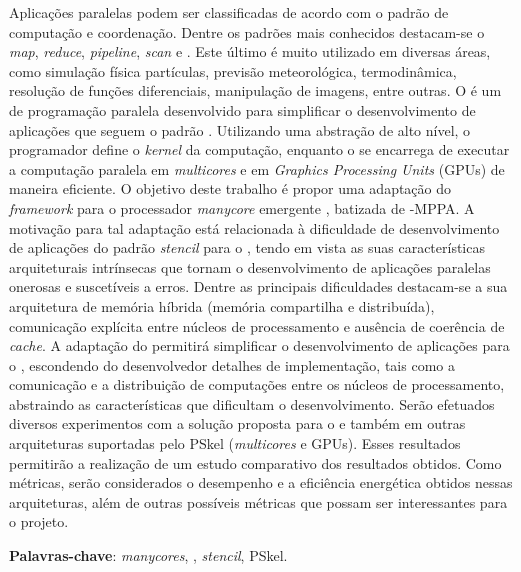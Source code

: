 
\setlength{\absparsep}{18pt} %
\begin{resumo}
Aplicações paralelas podem ser classificadas de acordo com o padrão de
computação e coordenação. Dentre os padrões mais conhecidos destacam-se o
\textit{map}, \textit{reduce}, \textit{pipeline}, \textit{scan} e \stencil.
Este último é muito utilizado em diversas áreas, como
simulação física partículas, previsão meteorológica, termodinâmica, resolução de
funções diferenciais, manipulação de imagens, entre outras. O \pskel é um \fw de
programação paralela desenvolvido para simplificar o desenvolvimento de
aplicações que seguem o padrão \stencil. Utilizando uma abstração de alto nível, o
programador define o \emph{kernel} da computação, enquanto o \fw se encarrega de
executar a computação paralela em \textit{multicores} e em \textit{Graphics Processing Units}
(GPUs) de maneira eficiente.
%
O objetivo deste trabalho é propor uma adaptação do \textit{framework} \pskel
para o processador \textit{manycore} emergente \mppa, batizada de \pskel-MPPA. A
motivação para tal adaptação está relacionada à dificuldade de desenvolvimento
de aplicações do padrão \textit{stencil} para o \mppa, tendo em vista as suas
características arquiteturais intrínsecas que tornam o desenvolvimento de
aplicações paralelas onerosas e suscetíveis a erros. Dentre as principais dificuldades
destacam-se a sua arquitetura de memória híbrida (memória compartilha e
distribuída), comunicação explícita entre núcleos de processamento e ausência de coerência de
\textit{cache}. A adaptação do \fw permitirá simplificar o desenvolvimento de
aplicações \stencil para o \mppa, escondendo do desenvolvedor detalhes de
implementação, tais como a comunicação e a distribuição de computações entre os
núcleos de processamento, abstraindo as características que dificultam o
desenvolvimento.
%
Serão efetuados diversos experimentos com a solução proposta para o \mppa
e também em outras arquiteturas suportadas pelo PSkel
(\textit{multicores} e GPUs). Esses resultados permitirão a realização de um
estudo comparativo dos resultados obtidos. Como métricas, serão considerados o
desempenho e a eficiência energética obtidos nessas arquiteturas, além de outras
possíveis métricas que possam ser interessantes para o projeto.

 \textbf{Palavras-chave}: \textit{manycores}, \mppa, \textit{stencil}, PSkel.
\end{resumo}


